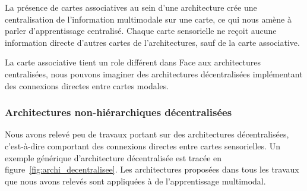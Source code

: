 \documentclass[../main]{subfiles}
\begin{document}
La présence de cartes associatives au sein d'une architecture crée une centralisation de l'information multimodale sur une carte, ce qui nous amène à parler d'apprentissage centralisé. Chaque carte sensorielle ne reçoit aucune information directe d'autres cartes de l'architectures, sauf de la carte associative.

La carte associative tient un role différent dans 
Face aux architectures centralisées, nous pouvons imaginer des architectures décentralisées implémentant des connexions directes entre cartes modales.

\subsubsection{Architectures non-hiérarchiques décentralisées}

Nous avons relevé peu de travaux portant sur des architectures décentralisées, c'est-à-dire comportant des connexions directes entre cartes sensorielles. Un exemple générique d'architecture décentralisée est tracée en figure~\ref{fig:archi_decentralisee}. Les architectures proposées dans tous les travaux que nous avons relevés sont appliquées à de l'apprentissage multimodal.



\end{document}
